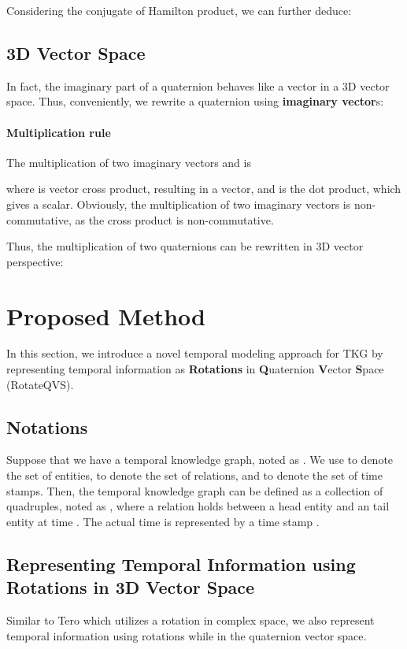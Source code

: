 \documentclass[11pt]{article}
\begin{document}
Considering the conjugate of Hamilton product, we can further deduce:


\subsection{3D Vector Space}
In fact, the imaginary part  of a quaternion behaves like a vector  in a 3D vector space.
Thus, conveniently, we rewrite a quaternion using \textbf{imaginary vector}s:


\paragraph{Multiplication rule} The multiplication of two imaginary vectors  and  is

where  is vector cross product, resulting in a vector, and  is the dot product, which gives a scalar.
Obviously, the multiplication of two imaginary vectors is non-commutative, as the cross product is non-commutative.

Thus, the multiplication of two quaternions can be rewritten in 3D vector perspective:







\section{Proposed Method}
\label{sec:our_method}
In this section, we introduce a novel temporal modeling approach for TKG by representing temporal information as \textbf{Rotations} in \textbf{Q}uaternion \textbf{V}ector \textbf{S}pace (RotateQVS).


\subsection{Notations}
Suppose that we have a temporal knowledge graph, noted as . We use  to denote the set of entities,  to denote the set of relations, and  to denote the set of time stamps.
Then, the temporal knowledge graph  can be defined as a collection of quadruples, noted as , where a relation  holds between a head entity  and an tail entity  at time .
The actual time  is represented by a time stamp .



\subsection{Representing Temporal Information using Rotations in 3D Vector Space}
Similar to Tero \cite{xu2020tero} which utilizes a rotation in complex space, we also represent temporal information using rotations while in the quaternion vector space.
\end{document}
